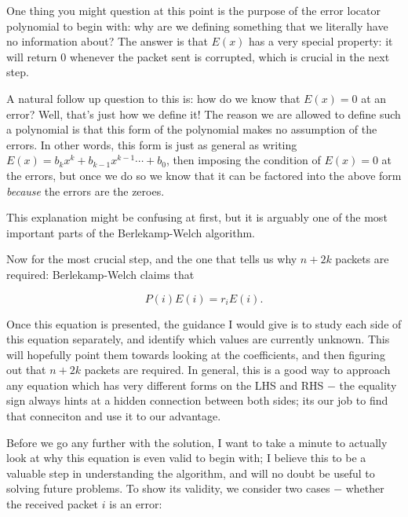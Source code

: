 \documentclass[10pt]{article}
\begin{document}
    \begin{guidance*}{}{}
        One thing you might question at this point is the purpose of the error locator polynomial to begin with: why are we defining something that we literally have no information about? The answer is that $E(x)$ has a very special property: it will return 0 whenever the packet sent is corrupted, which is crucial in the next step. 

        A natural follow up question to this is: how do we know that $E(x) = 0$ at an error? Well, that's just how we define it! The reason we are allowed to define such a polynomial is that this form of the polynomial makes no assumption of the errors. In other words, this form is just as general as writing $E(x) = b_kx^k + b_{k-1}x^{k-1}\cdots + b_0$, then imposing the condition of $E(x) = 0$ at the errors, but once we do so we know that it can be factored into the above form \textit{because} the errors are the zeroes.

        This explanation might be confusing at first, but it is arguably one of the most important parts of the Berlekamp-Welch algorithm.
    \end{guidance*}
    

    Now for the most crucial step, and the one that tells us why $n+2k$ packets are required: Berlekamp-Welch claims that 

    \[ P(i)E(i) = r_iE(i).\] 
    
    \begin{guidance*}{}{}
        Once this equation is presented, the guidance I would give is to study each side of this equation separately, and identify which values are currently unknown. This will hopefully point them towards looking at the coefficients, and then figuring out that $n+2k$ packets are required. In general, this is a good way to approach any equation which has very different forms on the LHS and RHS $-$ the equality sign always hints at a hidden connection between both sides; its our job to find that conneciton and use it to our advantage.
    \end{guidance*}
    
    Before we go any further with the solution, I want to take a minute to actually look at why this equation is even valid to begin with; I believe this to be a valuable step in understanding the algorithm, and will no doubt be useful to solving future problems. To show its validity, we consider two cases $-$ whether the received packet $i$ is an error:
    
\end{document}
